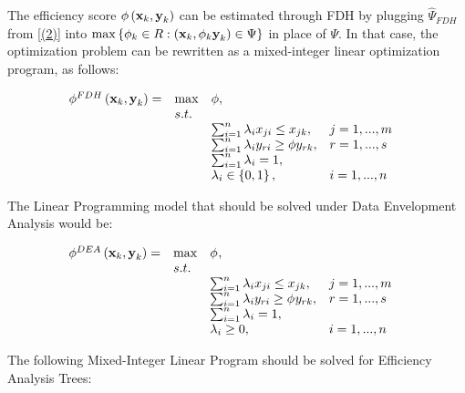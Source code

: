 The efficiency score \(\phi \left({\it \textbf{x}}_{k}, {\it \textbf{y}}_{k} \right)\) can be estimated through FDH by plugging \(\hat{\Psi }_{FDH}\) from \eqref{(2)} into \(\max \left\{\phi _{k} \in R:\left({\it \textbf{x}}_{k} ,\phi _{k} {\it \textbf{y}}_{k} \right)\in \Psi \right\}\) in place of \(\Psi\). In that case, the optimization problem can be rewritten as a mixed-integer linear optimization program, as follows:

\begin{equation} \label{(10)} 
\begin{array}{lllll} 
{\phi ^{FDH} \left({\it \textbf{x}}_{k} ,{\it \textbf{y}}_{k} \right)=} & {\max } & {\phi,} & {} & {} \\ 
{} & {s.t.} & {} & {} & {} \\ 
{} & {} & {\sum_{i=1}^{n}\lambda_{i} x_{ji} \le x_{jk} ,} & {j=1,...,m} & {} \\ 
{} & {} & {\sum_{i=1}^{n}\lambda_{i} y_{ri} \ge \phi y_{rk} ,} & {r=1,...,s} & {} \\ 
{} & {} & {\sum_{i=1}^{n}\lambda_{i} = 1,} & {} & {} \\ 
{} & {} & {\lambda _{i} \in \left\{0,1\right\},} & {i=1,...,n} & {} 
\end{array} 
\end{equation}

The Linear Programming model that should be solved under Data Envelopment Analysis would be:

\begin{equation} \label{(11)} 
\begin{array}{lllll} 
{\phi ^{DEA} \left({\it \textbf{x}}_{k} ,{\it \textbf{y}}_{k} \right)=} & {\max } & {\phi_{}, } & {} & {} \\ 
{} & {s.t.} & {} & {} & {} \\ 
{} & {} & {\sum_{i=1}^{n}\lambda_{i} x_{ji}  \le x_{jk} ,} & {j=1,...,m} & {} \\ 
{} & {} & {\sum_{i=1}^{n}\lambda_{i} y_{ri}  \ge \phi_{} y_{rk} ,} & {r=1,...,s} & {} \\ 
{} & {} & {\sum_{i=1}^{n}\lambda_{i}  =1,} & {} & {} \\ 
{} & {} & {\lambda _{i} \ge 0,} & {i=1,...,n} & {} 
\end{array} 
\end{equation}

The following Mixed-Integer Linear Program should be solved for Efficiency Analysis Trees:

